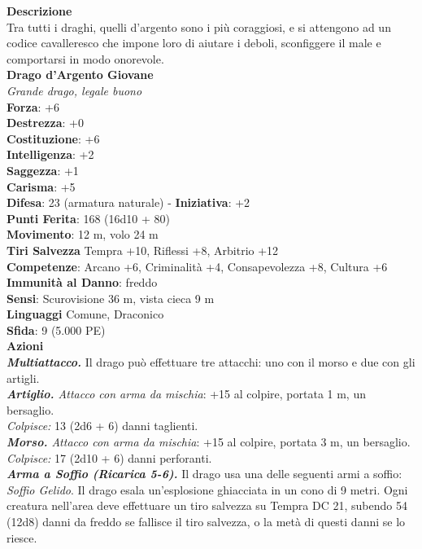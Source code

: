 \begin{multicols}{2}
\textbf{Descrizione}\\
Tra tutti i draghi, quelli d’argento sono i più coraggiosi, e si attengono ad un codice cavalleresco che impone loro di aiutare i deboli, sconfiggere il male e comportarsi in modo onorevole.\\
\medskip\textbf{Drago d'Argento Giovane}\\
\emph{Grande drago, legale buono}\\
\textbf{Forza}: +6\\
\textbf{Destrezza}: +0\\
\textbf{Costituzione}: +6\\
\textbf{Intelligenza}: +2\\
\textbf{Saggezza}: +1\\
\textbf{Carisma}: +5\\
\textbf{Difesa}: 23 (armatura naturale) - \textbf{Iniziativa}: +2\\
\textbf{Punti Ferita}: 168 (16d10 + 80)\\
\textbf{Movimento}: 12 m, volo 24 m\\
\textbf{Tiri Salvezza} Tempra +10, Riflessi +8, Arbitrio +12\\
\textbf{Competenze}: Arcano +6, Criminalità +4, Consapevolezza +8, Cultura +6\\
\textbf{Immunità al Danno}: freddo\\
\textbf{Sensi}: Scurovisione 36 m, vista cieca 9 m\\
\textbf{Linguaggi} Comune, Draconico\\
\textbf{Sfida}: 9 (5.000 PE)\smallskip\\
\smallskip\textbf{Azioni}\\
\emph{\textbf{Multiattacco.}} Il drago può effettuare tre attacchi: uno con il morso e due con gli artigli.\\
\emph{\textbf{Artiglio.} Attacco con arma da mischia}: +15 al colpire, portata 1 m, un bersaglio.\\
\emph{Colpisce:} 13 (2d6 + 6) danni taglienti.\\
\emph{\textbf{Morso.} Attacco con arma da mischia}: +15 al colpire, portata 3 m, un bersaglio.\\
\emph{Colpisce:} 17 (2d10 + 6) danni perforanti.\\
\emph{\textbf{Arma a Soffio (Ricarica 5-6).}} Il drago usa una delle seguenti armi a soffio:\\
\emph{Soffio Gelido}. Il drago esala un'esplosione ghiacciata in un cono di 9 metri. Ogni creatura nell'area deve effettuare un tiro salvezza su Tempra DC  21, subendo 54 (12d8) danni da freddo se fallisce il tiro salvezza, o la metà di questi danni se lo riesce.\\

\end{multicols}
